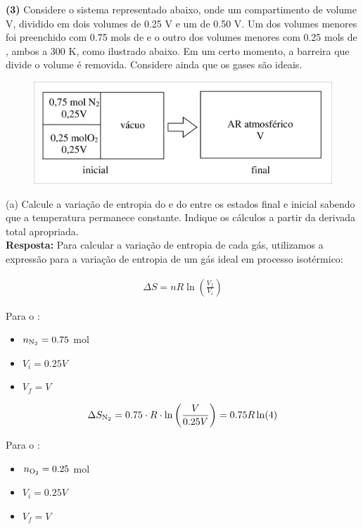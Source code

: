 \textbf{(3)} Considere o sistema representado abaixo, onde um compartimento de
volume V, dividido em dois volumes de \num{0,25} V e um de \num{0,50} V. Um dos volumes
menores foi preenchido com \num{0,75} mols de  e o outro dos volumes menores com
\num{0,25} mols de , ambos a 300 K, como ilustrado abaixo. Em um certo momento, a
barreira que divide o volume é removida.  Considere ainda que os gases são
ideais.\\

\begin{figure}[H]
    \centering
    \includegraphics[width=.8\linewidth]{Q3.png}
\end{figure}

(a) Calcule a variação de entropia do  e do  entre os estados
final e inicial sabendo que a temperatura permanece constante. Indique os
cálculos a partir da derivada total apropriada.\\

    \textbf{Resposta:} Para calcular a variação de entropia de cada gás, utilizamos a expressão para a variação de entropia de um gás ideal em processo isotérmico:

    \begin{align*}
    \Delta S = nR \ln\left(\frac{V_f}{V_i}\right)
    \end{align*}
    
    Para o :
    \begin{itemize}
        \item $n_{\ce{N2}} = \num{0,75}$ mol
        \item $V_i = \num{0,25}V$
        \item $V_f = V$
    \end{itemize}
    
    \begin{align*}
    \Delta S_{\ce{N2}} = \num{0,75} \cdot R \cdot \ln\left(\frac{V}{\num{0,25}V}\right) = \num{0,75}R\ln(4)
    \end{align*}

    Para o :
    \begin{itemize}
        \item $n_{\ce{O2}} = \num{0,25}$ mol
        \item $V_i = \num{0,25}V$
        \item $V_f = V$
    \end{itemize}
    

